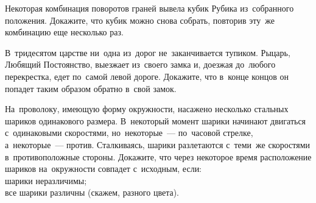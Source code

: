 \begin{problems}
\item
Некоторая комбинация поворотов граней вывела кубик Рубика из~собранного
положения.
Докажите, что кубик можно снова собрать, повторив эту~же комбинацию еще
несколько раз.

\item
В~тридесятом царстве ни~одна из~дорог не~заканчивается тупиком.
Рыцарь, Любящий Постоянство, выезжает из~своего замка и, доезжая до~любого
перекрестка, едет по~самой левой дороге.
Докажите, что в~конце концов он попадет таким образом обратно в~свой замок.

\item
На~проволоку, имеющую форму окружности, насажено несколько стальных шариков
одинакового размера.
В~некоторый момент шарики начинают двигаться с~одинаковыми скоростями,
но~некоторые~--- по~часовой стрелке, а~некоторые~--- против.
Сталкиваясь, шарики разлетаются с~теми~же скоростями в~противоположные стороны.
Докажите, что через некоторое время расположение шариков на~окружности совпадет
с~исходным, если:
\\
\subproblem шарики неразличимы;
\\
\subproblem все шарики различны (скажем, разного цвета).

\end{problems}

